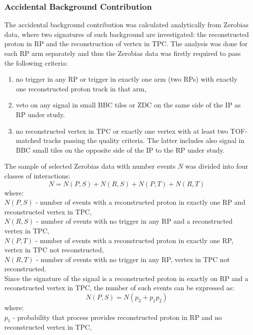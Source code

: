 \subsubsection{Accidental Background Contribution}
The accidental background contribution was calculated analytically from Zerobias data, where two signatures of such background are investigated: the reconstructed proton in RP and the reconstruction of vertex in TPC. The analysis was done for each RP arm separately and thus the 
 Zerobias data was firstly required to pass the following criteria:
\begin{enumerate}
	\item no trigger in any RP or trigger in exactly one arm (two RPs) with exactly one reconstructed proton track in that arm,
	\item veto on any signal in small BBC tiles or ZDC on the same  side of the IP as  RP under study.
	\item no reconstructed vertex in TPC or exactly one vertex with at least two TOF-matched tracks passing the quality criteria. The latter includes also signal in BBC small tiles on the opposite side of the IP to the RP under study. 
\end{enumerate}
 The sample of selected Zerobias data with  number events $N$ was divided into four classes of interactions:
\begin{equation}
N=N(P,S)+N(R,S)+N(P,T)+N(R,T)
\label{eq:accidentalSTAR_N}
\end{equation}
where:\\
$N(P,S)$ - number of events with a reconstructed proton in exactly one RP and reconstructed vertex in TPC, \\
$N(R,S)$  - number of events with no trigger in any RP and a reconstructed vertex in TPC,\\
$N(P,T)$ - number of events with a reconstructed proton in exactly one RP, vertex in TPC not reconstructed,\\
$N(R,T)$ - number of events with no trigger in any RP, vertex in TPC not reconstructed.\\
\newline\newline
Since the signature of the signal is a reconstructed proton in exactly on RP and a reconstructed vertex in TPC, the number of such events can be expressed as:
\begin{equation}
N(P,S)=N\left(p_3+p_1p_2\right)
\end{equation}
where:\\
 $p_1$ - probability that process provides reconstructed proton in RP and no reconstructed vertex in TPC,\\
